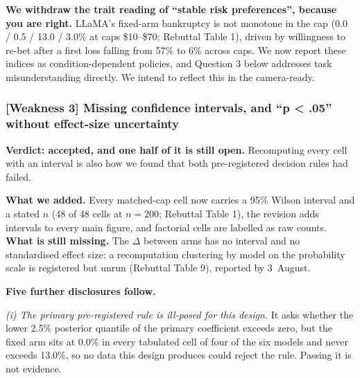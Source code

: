 \vspace{0.3em}
\noindent\textbf{We withdraw the trait reading of ``stable risk preferences'', because you are
right.} LLaMA's fixed-arm bankruptcy is not monotone in the cap (0.0 / 0.5 / 13.0 / 3.0\% at
caps \$10--\$70; Rebuttal Table 1), driven by willingness to re-bet after a first loss falling
from 57\% to 6\% across caps. We now report these indices as condition-dependent policies, and
Question 3 below addresses task misunderstanding directly. We intend to reflect this in the
camera-ready.


\subsubsection*{\textbf{[Weakness 3]} Missing confidence intervals, and ``p < .05'' without effect-size uncertainty}

\textbf{Verdict: accepted, and one half of it is still open.} Recomputing every cell with an
interval is also how we found that both pre-registered decision rules had failed.

\vspace{0.3em}
\noindent\textbf{What we added.} Every matched-cap cell now carries a 95\% Wilson interval and a
stated $n$ (48 of 48 cells at $n = 200$; Rebuttal Table 1), the revision adds intervals to
every main figure, and factorial cells are labelled as raw counts.
\textbf{What is still missing.} The $\Delta$ between arms has no interval and no standardised
effect size; a recomputation clustering by model on the probability scale is registered but
unrun (Rebuttal Table 9), reported by 3~August.

\vspace{0.3em}
\noindent\textbf{Five further disclosures follow.}

\textit{(i) The primary pre-registered rule is ill-posed for this design.} It asks whether the
lower 2.5\% posterior quantile of the primary coefficient exceeds zero, but the fixed arm sits
at 0.0\% in every tabulated cell of four of the six models and never exceeds 13.0\%, so no data
this design produces could reject the rule. Passing it is not evidence.

